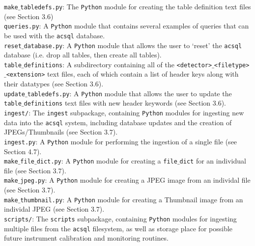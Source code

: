 \documentclass[10pt,journal,compsoc]{IEEEtran}
\begin{document}
\noindent\texttt{make$\_$tabledefs.py}: The \texttt{Python} module for creating the table definition text files (see Section 3.6) \\

\noindent\texttt{queries.py}: A \texttt{Python} module that contains several examples of queries that can be used with the
\texttt{acsql} database.\\

\noindent\texttt{reset$\_$database.py}: A \texttt{Python} module that allows the user to `reset' the \texttt{acsql} database (i.e.
drop all tables, then create all tables).\\

\noindent\texttt{table$\_$definitions}: A subdirectory containing all of the \texttt{<detector>$\_$<filetype>$\_$<extension>} text files,
each of which contain a list of header keys along with their datatypes (see Section 3.6).\\

\noindent\texttt{update$\_$tabledefs.py}: A \texttt{Python} module that allows the user to update the \texttt{table$\_$definitions}
text files with new header keywords (see Section 3.6).\\

\noindent\texttt{ingest/}: The \texttt{ingest} subpackage, containing \texttt{Python} modules for ingesting new data into the
\texttt{acsql} system, including database updates and the creation of JPEGs/Thumbnails (see Section 3.7).\\

\noindent\texttt{ingest.py}: A \texttt{Python} module for performing the ingestion of a single file (see Section 4.7).\\

\noindent\texttt{make$\_$file$\_$dict.py}: A \texttt{Python} module for creating a \texttt{file$\_$dict} for an individual file
(see Section 3.7).\\

\noindent\texttt{make$\_$jpeg.py}: A \texttt{Python} module for creating a JPEG image from an individal file (see Section 3.7).\\

\noindent\texttt{make$\_$thumbnail.py}: A \texttt{Python} module for creating a Thumbnail image from an individal JPEG (see Section 3.7).\\

\noindent\texttt{scripts/}: The \texttt{scripts} subpackage, containing \texttt{Python} modules for ingesting multiple files from
the \texttt{acsql} filesystem, as well as storage place for possible future instrument calibration and monitoring routines. \\
\end{document}
